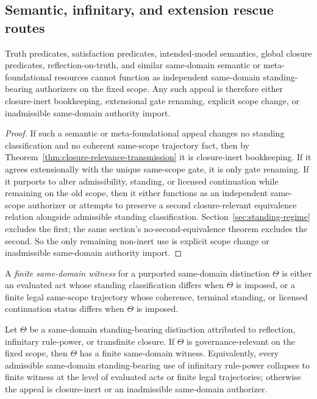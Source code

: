 \subsection{Semantic, infinitary, and extension rescue routes}

\begin{theorem}
\label{thm:no-semantic-standing-import}
Truth predicates, satisfaction predicates, intended-model semantics, global closure predicates, reflection-on-truth, and similar same-domain semantic or meta-foundational resources cannot function as independent same-domain standing-bearing authorizers on the fixed scope. Any such appeal is therefore either closure-inert bookkeeping, extensional gate renaming, explicit scope change, or inadmissible same-domain authority import.
\end{theorem}

\begin{proof}
If such a semantic or meta-foundational appeal changes no standing classification and no coherent same-scope trajectory fact, then by Theorem~\ref{thm:closure-relevance-transmission} it is closure-inert bookkeeping. If it agrees extensionally with the unique same-scope gate, it is only gate renaming. If it purports to alter admissibility, standing, or licensed continuation while remaining on the old scope, then it either functions as an independent same-scope authorizer or attempts to preserve a second closure-relevant equivalence relation alongside admissible standing classification. Section~\ref{sec:standing-regime} excludes the first; the same section's no-second-equivalence theorem excludes the second. So the only remaining non-inert use is explicit scope change or inadmissible same-domain authority import.
\end{proof}

\begin{definition}
A \emph{finite same-domain witness} for a purported same-domain distinction $\Theta$ is either an evaluated act whose standing classification differs when $\Theta$ is imposed, or a finite legal same-scope trajectory whose coherence, terminal standing, or licensed continuation status differs when $\Theta$ is imposed.
\end{definition}

\begin{theorem}
\label{thm:infinitary-admissibility-collapse}
Let $\Theta$ be a same-domain standing-bearing distinction attributed to reflection, infinitary rule-power, or transfinite closure. If $\Theta$ is governance-relevant on the fixed scope, then $\Theta$ has a finite same-domain witness. Equivalently, every admissible same-domain standing-bearing use of infinitary rule-power collapses to finite witness at the level of evaluated acts or finite legal trajectories; otherwise the appeal is closure-inert or an inadmissible same-domain authorizer.
\end{theorem}

